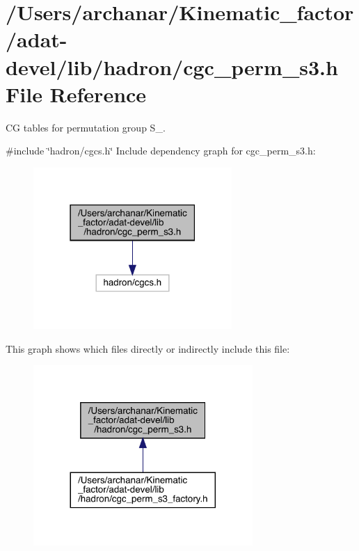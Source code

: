 \hypertarget{adat-devel_2lib_2hadron_2cgc__perm__s3_8h}{}\section{/\+Users/archanar/\+Kinematic\+\_\+factor/adat-\/devel/lib/hadron/cgc\+\_\+perm\+\_\+s3.h File Reference}
\label{adat-devel_2lib_2hadron_2cgc__perm__s3_8h}


CG tables for permutation group S\+\_.  


{\ttfamily \#include \char`\"{}hadron/cgcs.\+h\char`\"{}}\newline
Include dependency graph for cgc\+\_\+perm\+\_\+s3.\+h\+:
\nopagebreak
\begin{figure}[H]
\begin{center}
\leavevmode
\includegraphics[width=214pt]{da/d02/adat-devel_2lib_2hadron_2cgc__perm__s3_8h__incl}
\end{center}
\end{figure}
This graph shows which files directly or indirectly include this file\+:
\nopagebreak
\begin{figure}[H]
\begin{center}
\leavevmode
\includegraphics[width=236pt]{d2/d87/adat-devel_2lib_2hadron_2cgc__perm__s3_8h__dep__incl}
\end{center}
\end{figure}
